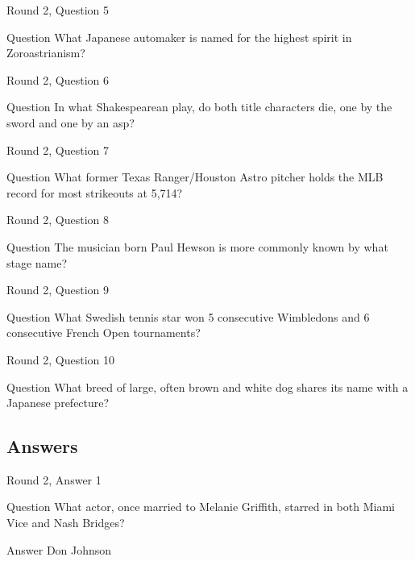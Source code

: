 \documentclass[11pt]{beamer}
\begin{document}
\begin{frame}{Round 2, Question 5}
\begin{block}{Question}
What Japanese automaker is named for the highest spirit in Zoroastrianism\@?
\end{block}
\end{frame}
    

\begin{frame}{Round 2, Question 6}
\begin{block}{Question}
In what Shakespearean play, do both title characters die, one by the sword and one by an asp\@?
\end{block}
\end{frame}
    

\begin{frame}{Round 2, Question 7}
\begin{block}{Question}
What former Texas Ranger/Houston Astro pitcher holds the MLB record for most strikeouts at 5,714\@?
\end{block}
\end{frame}
    

\begin{frame}{Round 2, Question 8}
\begin{block}{Question}
The musician born Paul Hewson is more commonly known by what stage name\@?
\end{block}
\end{frame}
    

\begin{frame}{Round 2, Question 9}
\begin{block}{Question}
What Swedish tennis star won 5 consecutive Wimbledons and 6 consecutive French Open tournaments\@?
\end{block}
\end{frame}
    

\begin{frame}{Round 2, Question 10}
\begin{block}{Question}
What breed of large, often brown and white dog shares its name with a Japanese prefecture\@?
\end{block}
\end{frame}
    
\subsection{Answers}

\begin{frame}{Round 2, Answer 1}
\begin{block}{Question}
What actor, once married to Melanie Griffith, starred in both Miami Vice and Nash Bridges\@?
\end{block}
\pause{}
\begin{block}{Answer}
Don Johnson
\end{block}
\end{frame}
    
\end{document}
